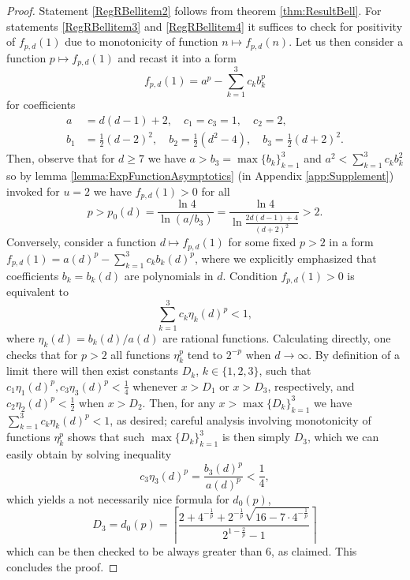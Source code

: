 \documentclass[reqno]{amsart}
\theoremstyle{plain}
\theoremstyle{note}
\begin{document}
\begin{proof}
Statement \ref{RegRBellitem2} follows from theorem \ref{thm:ResultBell}. For statements \ref{RegRBellitem3} and \ref{RegRBellitem4} it suffices to check for positivity of $f_{p,d}(1)$ due to monotonicity of function $n\mapsto f_{p,d}(n)$. Let us then consider a function $p\mapsto f_{p,d}(1)$ and recast it into a form
\begin{equation}
    f_{p,d}(1) = a^p - \sum_{k=1}^{3} c_k b_{k}^{p}
\end{equation}
for coefficients
\begin{align}
    a &= d(d-1)+2, \quad c_1 = c_3 = 1, \quad c_2 = 2, \\
    b_1 &= \frac{1}{2} (d-2)^2, \quad b_2 = \frac{1}{2}(d^2 - 4), \quad b_3 = \frac{1}{2}(d+2)^2.
\end{align}
Then, observe that for $d \geqslant 7$ we have $a > b_3 = \max{\{b_k\}_{k=1}^{3}}$ and $a^2 < \sum_{k=1}^{3} c_k b_{k}^{2}$ so by lemma \ref{lemma:ExpFunctionAsymptotics} (in Appendix \ref{app:Supplement}) invoked for $u=2$ we have $f_{p,d}(1) > 0$ for all
\begin{equation}
    p > p_0 (d) = \frac{\ln{4}}{\ln{(a/b_3)}} = \frac{\ln{4}}{\ln{\frac{2d(d-1)+4}{(d+2)^2}}} > 2.
\end{equation}
Conversely, consider a function $d \mapsto f_{p,d}(1)$ for some fixed $p > 2$ in a form $f_{p,d}(1) = a(d)^p - \sum_{k=1}^{3} c_k b_{k}(d)^p$, where we explicitly emphasized that coefficients $b_k = b_k (d)$ are polynomials in $d$. Condition $f_{p,d}(1) > 0$ is equivalent to
\begin{equation}
    \sum_{k=1}^{3} c_k \eta_k (d)^p < 1,
\end{equation}
where $\eta_k (d) = b_k (d) / a(d)$ are rational functions. Calculating directly, one checks that for $p > 2$ all functions $\eta_{k}^{p}$ tend to $2^{-p}$ when $d\to\infty$. By definition of a limit there will then exist constants $D_k$, $k \in \{1,2,3\}$, such that $c_1 \eta_1 (d)^{p}, c_3 \eta_3 (d)^{p} < \frac{1}{4}$ whenever $x > D_1$ or $x > D_3$, respectively, and $c_2 \eta_2 (d)^{p} < \frac{1}{2}$ when $x > D_2$. Then, for any $x > \max{\{D_k\}_{k=1}^{3}}$ we have $\sum_{k=1}^{3} c_k \eta_k (d)^p < 1$, as desired; careful analysis involving monotonicity of functions $\eta_{k}^{p}$ shows that such $\max{\{D_k\}_{k=1}^{3}}$ is then simply $D_3$, which we can easily obtain by solving inequality
\begin{equation}
    c_3 \eta_3 (d)^p = \frac{b_3 (d)^{p}}{a(d)^{p}} < \frac{1}{4},
\end{equation}
which yields a not necessarily nice formula for $d_0 (p)$,
\begin{equation}
    D_3 = d_0 (p) = \left\lceil\frac{2 + 4^{-\frac{1}{p}} + 2^{-\frac{1}{p}}\sqrt{16 - 7 \cdot 4^{-\frac{1}{p}}}}{2^{1-\frac{2}{p}}-1}\right\rceil
\end{equation}
which can be then checked to be always greater than 6, as claimed. This concludes the proof.
\end{proof}
\end{document}
